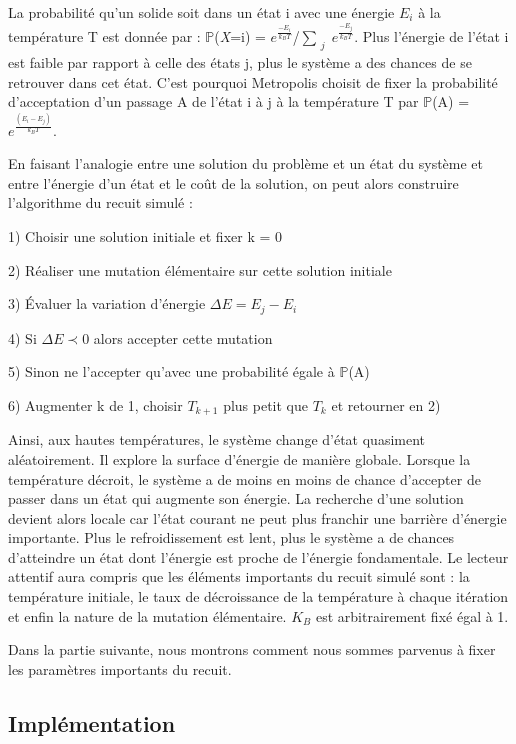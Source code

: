 \documentclass{article}%
\begin{document}
	La probabilité qu'un solide soit dans un état i avec une énergie $E_i$ à la température T est donnée par : $\mathbb{P}$(\emph{X}=i) = $e^{\frac{-E_i}{k_BT}}$/$\sum_{\substack{j}}$$e^{\frac{-E_j}{k_BT}}$. Plus l'énergie de l'état i est faible par rapport à celle des états j, plus le système a des chances de se retrouver dans cet état. C'est pourquoi Metropolis choisit de fixer la probabilité d'acceptation d'un passage A de l'état i à j à la température T par $\mathbb{P}$(A) = $e^\frac{(E_i-E_j)}{k_BT}$.
	
	\vspace{1cm}
	
	En faisant l'analogie entre une solution du problème et un état du système et entre l'énergie d'un état et le coût de la solution, on peut alors construire l'algorithme du recuit simulé :
	
	1) Choisir une solution initiale et fixer k = 0
	
	2) Réaliser une mutation élémentaire sur cette solution initiale
	
	3) Évaluer la variation d'énergie $\Delta{E}=E_j-E_i$
	
	4) Si $\Delta{E}\prec{0}$ alors accepter cette mutation 
	
	5) Sinon ne l'accepter qu'avec une probabilité égale à $\mathbb{P}$(A)
	
	6) Augmenter k de 1, choisir $T_{k+1}$ plus petit que $T_{k}$ et retourner en 2)

\vspace{1cm}

Ainsi, aux hautes températures, le système change d'état quasiment aléatoirement. Il explore la surface d'énergie de manière globale. Lorsque la température décroit, le système a de moins en moins de chance d'accepter de passer dans un état qui augmente son énergie. La recherche d'une solution devient alors locale car l'état courant ne peut plus franchir une barrière d'énergie importante. Plus le refroidissement est lent, plus le système a de chances d'atteindre un état dont l'énergie est proche de l'énergie fondamentale. Le lecteur attentif aura compris que les éléments importants du recuit simulé sont : la température initiale, le taux de décroissance de la température à chaque itération et enfin la nature de la mutation élémentaire. $K_B$ est arbitrairement fixé égal à 1.

	Dans la partie suivante, nous montrons comment nous sommes parvenus à fixer les paramètres importants du recuit.

\subsection{Implémentation}
\end{document}
